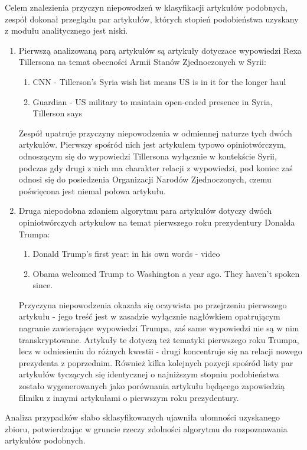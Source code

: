 Celem znalezienia przyczyn niepowodzeń w klasyfikacji artykułów podobnych, zespół dokonał przeglądu par artykułów, których stopień podobieństwa uzyskany z modułu analitycznego jest niski.
\begin{enumerate}
	\item Pierwszą analizowaną parą artykułów są artykuły dotyczace wypowiedzi Rexa Tillersona na temat obecności Armii Stanów Zjednoczonych w Syrii:
	\begin{enumerate}
		\item CNN - Tillerson's Syria wish list means US is in it for the longer haul 
		\item Guardian - 
US military to maintain open-ended presence in Syria, Tillerson says
	\end{enumerate}
	Zespół upatruje przyczyny niepowodzenia w odmiennej naturze tych dwóch artykułów. Pierwszy spośród nich jest artykułem typowo opiniotwórczym, odnoszącym się do wypowiedzi Tillersona wyłącznie w kontekście Syrii, podczas gdy drugi z nich ma charakter relacji z wypowiedzi, pod koniec zaś odnosi się do posiedzenia Organizacji Narodów Zjednoczonych, czemu poświęcona jest niemal połowa artykułu.
	
	\item Druga niepodobna zdaniem algorytmu para artykułów dotyczy dwóch opiniotwórczych artykułow na temat pierwszego roku prezydentury Donalda Trumpa:
	\begin{enumerate}
		\item Donald Trump's first year: in his own words - video
		\item Obama welcomed Trump to Washington a year ago. They haven't spoken since.
	\end{enumerate}
	Przyczyna niepowodzenia okazała się oczywista po przejrzeniu pierwszego artykułu - jego treść jest w zasadzie wyłącznie nagłówkiem opatrującym nagranie zawierające wypowiedzi Trumpa, zaś same wypowiedzi nie są w nim transkryptowane.  Artykuły te dotyczą też tematyki pierwszego roku Trumpa, lecz w odniesieniu do różnych kwestii - drugi koncentruje się na relacji nowego prezydenta z poprzednim. Również kilka kolejnych pozycji spośród listy par artykułów tyczących się identycznej o najniższym stopniu podobieństwa zostało wygenerowanych jako porównania artykułu będącego zapowiedzią filmiku z innymi artykułami o pierwszym roku prezydentury.
\end{enumerate}

Analiza przypadków słabo sklasyfikowanych ujawniła ułomności uzyskanego zbioru, potwierdzając w gruncie rzeczy zdolności algorytmu do rozpoznawania artykułów podobnych.